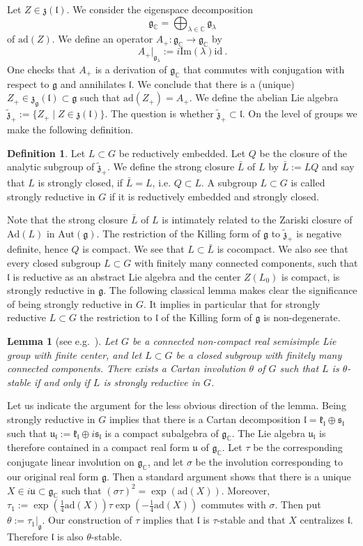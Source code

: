\documentclass[10]{amsart}
\newtheorem{lem}[thm]{Lemma}
\theoremstyle{remark}
\theoremstyle{definition}
\newtheorem{Def}[thm]{Definition}
\numberwithin{equation}{section}
\newcommand{\C}{\mathbb{C}}           %
\newcommand{\id}{\mathrm{id}}
\newcommand{\Ad}{\text{Ad}}
\newcommand{\ad}{\text{ad}}
\newcommand{\Aut}{{\mathrm{Aut}}}
\newcommand{\fg}{{\mathfrak g}}
\newcommand{\fk}{{\mathfrak k}}
\newcommand{\fl}{{\mathfrak l}}
\newcommand{\fu}{{\mathfrak u}}
\newcommand{\fs}{{\mathfrak s}}
\newcommand{\fz}{{\mathfrak z}}
\newcommand{\defn}{{:=}}
\renewcommand{\Im}{\mathrm{Im}}
\begin{document}
{Let $Z\in \fz(\fl)$. We consider the eigenspace decomposition   
$$ \fg_\C = \bigoplus_{\lambda\in \C} \fg_\lambda $$
of  $\ad(Z)$. We define an operator $A_+:\fg_\C\rightarrow \fg_\C$ by
$$  A_+\vert_{\fg_\lambda}\defn{i}\Im(\lambda)\id\ .$$
One checks that $A_+$ is a derivation of $\fg_\C$ that commutes with conjugation with respect to $\fg$ and annihilates $\fl$.
We conclude that there is a (unique) $Z_+\in\fz_\fg(\fl)\subset \fg$ such that $\ad(Z_+)=A_+$.  We define the abelian Lie algebra $\tilde\fz_+:=\{Z_+\mid Z\in\fz(\fl)\}$.
The question is whether  $\tilde\fz_+\subset \fl$. On the level of groups we make the following definition.

\begin{Def}\label{qa}
Let $L\subset G$ be reductively embedded.
Let $Q$ be the closure of the analytic subgroup of  $\tilde\fz_+$. We define the strong closure $\bar L$ of $L$ by $\bar L:=LQ$ and say that $L$ is strongly closed,
if $\bar L =L$, i.e. $Q\subset L$. A subgroup  $L\subset G$ is called strongly reductive in $G$ if it is reductively embedded and strongly closed.
\end{Def}
 
Note that the strong closure $\bar L$ of $L$ is intimately related to the Zariski closure of $\Ad(L)$ in $\Aut(\fg)$.
The restriction of the Killing form of $\fg$
to $\tilde\fz_+$ is negative definite, hence $Q$ is compact. We see that $L\subset \bar L$ is cocompact. 
We also see that every closed subgroup $L\subset G$ with finitely many connected components, such that $\fl$ is reductive as an abstract Lie algebra and the center $Z(L_0)$ is compact, is strongly reductive in $\fg$. The following classical lemma makes clear the significance of being strongly reductive in $G$. It implies in particular that for strongly reductive $L\subset G$ the restriction to $\fl$ of the Killing form of $\fg$ is non-degenerate.


\begin{lem} [see e.g.~\cite{Mos55}]\label{knuff}
Let $G$ be a connected non-compact real semisimple Lie group with finite center, and let $L\subset G$ be a closed subgroup with finitely many connected components. 
There exists a Cartan involution $\theta$ of $G$ such that $L$ is $\theta$-stable if and only if $L$ is strongly reductive in $G$.
\end{lem}

Let us indicate the argument for the less obvious direction of the lemma. Being strongly reductive in $G$ implies that there is a
Cartan decomposition $\fl=\fk_\fl\oplus\fs_\fl$ such that $\fu_\fl:=\fk_\fl \oplus i\fs_\fl$ is a compact  subalgebra of $\fg_\C$. The Lie algebra $\fu_\fl$ is therefore contained in a compact real form $\fu$ of $\fg_\C$.
Let $\tau$ be the corresponding conjugate linear involution on $\fg_\C$, and let $\sigma$ be the involution corresponding to our original real form $\fg$.
Then a standard argument shows that there is a unique $X\in i\fu\subset \fg_\C$ such that $(\sigma\tau)^2=\exp(\ad(X))$. Moreover, $\tau_1:= \exp(\frac{1}{4}\ad(X))\tau \exp(-\frac{1}{4}\ad(X))$
commutes with $\sigma$. Then put $\theta\defn\tau_1|_\fg$. Our construction of $\tau$ implies that $\fl$ is $\tau$-stable and that $X$ centralizes $\fl$. Therefore $\fl$ is also $\theta$-stable.


}
\end{document}
